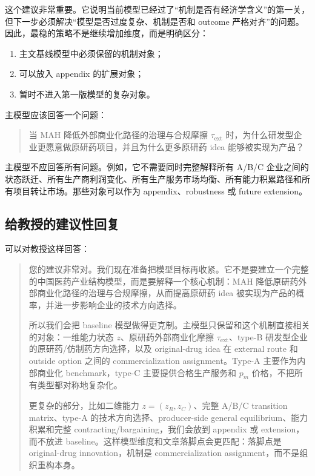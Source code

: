\documentclass[12pt]{article}
\newcommand{\tauext}{\tau_{\mathrm{ext}}}
\begin{document}
这个建议非常重要。它说明当前模型已经过了“机制是否有经济学含义”的第一关，但下一步必须解决“模型是否过度复杂、机制是否和 outcome 严格对齐”的问题。因此，最稳的策略不是继续增加维度，而是明确区分：
\begin{enumerate}
    \item 主文基线模型中必须保留的机制对象；
    \item 可以放入 appendix 的扩展对象；
    \item 暂时不进入第一版模型的复杂对象。
\end{enumerate}

主模型应该回答一个问题：
\begin{quote}
当 MAH 降低外部商业化路径的治理与合规摩擦 $\tauext$ 时，为什么研发型企业更愿意做原研药项目，并且为什么更多原研药 idea 能够被实现为产品？
\end{quote}

主模型不应回答所有问题。例如，它不需要同时完整解释所有 A/B/C 企业之间的状态跃迁、所有生产商利润变化、所有生产服务市场均衡、所有能力积累路径和所有项目转让市场。那些对象可以作为 appendix、robustness 或 future extension。

\subsection{给教授的建议性回复}

可以对教授这样回答：

\begin{quote}
您的建议非常对。我们现在准备把模型目标再收紧。它不是要建立一个完整的中国医药产业结构模型，而是要解释一个核心机制：MAH 降低原研药外部商业化路径的治理与合规摩擦，从而提高原研药 idea 被实现为产品的概率，并进一步影响企业的技术方向选择。

所以我们会把 baseline 模型做得更克制。主模型只保留和这个机制直接相关的对象：一维能力状态 $z$、原研药外部商业化摩擦 $\tauext$、type-B 研发型企业的原研药/仿制药方向选择，以及 original-drug idea 在 external route 和 outside option 之间的 commercialization assignment。Type-A 主要作为内部商业化 benchmark，type-C 主要提供合格生产服务和 $p_m$ 价格，不把所有类型都对称地复杂化。

更复杂的部分，比如二维能力 $z=(z_R,z_C)$、完整 A/B/C transition matrix、type-A 的技术方向选择、producer-side general equilibrium、能力积累和完整 contracting/bargaining，我们会放到 appendix 或 extension，而不放进 baseline。这样模型维度和文章落脚点会更匹配：落脚点是 original-drug innovation，机制是 commercialization assignment，而不是组织重构本身。
\end{quote}
\end{document}
